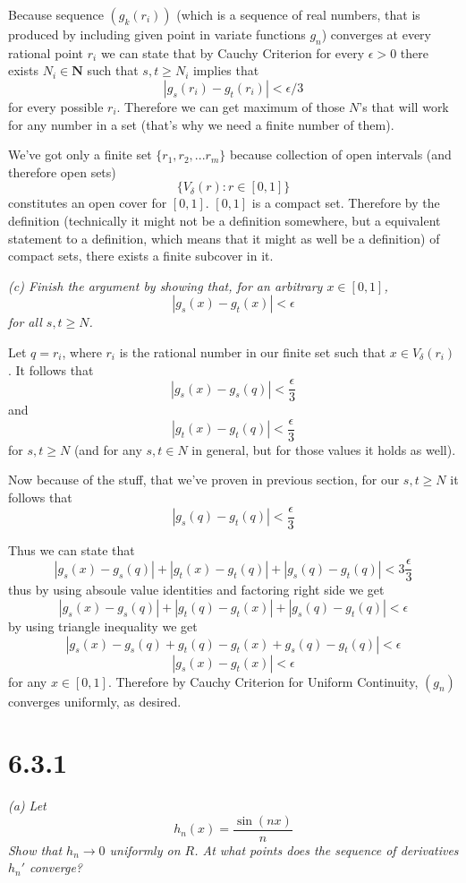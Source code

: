 \documentclass[11pt,oneside,titlepage]{book}
\begin{document}
Because sequence  $(g_k(r_i))$ (which is a sequence of real numbers, that is
produced by including given point in variate functions  $g_n$)
converges at every rational point $r_i$ we can state
that by Cauchy Criterion for every $\epsilon > 0$  there exists
$N_i \in \textbf{N}$ such that $s, t \geq N_i$ implies that
$$|g_s(r_i) - g_t(r_i)| < \epsilon/3$$
for every possible $r_i$. Therefore we can get maximum of those $N$'s
that will work for any number in a set (that's why we need a finite number
of them).

We've got only a finite set $\{r_1, r_2, ... r_m\}$ because collection of
open intervals (and therefore open sets)
$$\{V_\delta(r): r \in [0, 1]\}$$
constitutes an open cover for $[0, 1]$. $[0, 1]$ is a compact set.
Therefore by the definition (technically
it might not be a definition somewhere,
but a equivalent statement to a definition,
which means that it might as well be a definition) of compact sets,
there exists a finite subcover in it.

\textit{(c) Finish the argument by showing that, for an arbitrary
  $x \in [0, 1]$,}
$$|g_s(x) - g_t(x)| < \epsilon$$
\textit{for all $s, t \geq N$.}

Let $q = r_i$, where $r_i$ is the rational number in our finite set
such that $x \in V_\delta(r_i)$.
It follows that 
$$|g_s(x) - g_s(q)| < \frac{\epsilon}{3}$$
and 
$$|g_t(x) - g_t(q)| < \frac{\epsilon}{3}$$
for $s, t \geq N$ (and for any $s, t \in N$ in general, but for those
values it holds as well).

Now because of the stuff, that we've proven in previous section, for
our  $s, t \geq N$ it follows that 
$$|g_s(q) - g_t(q)| < \frac{\epsilon}{3}$$

Thus we can state that
$$|g_s(x) - g_s(q)| + |g_t(x) - g_t(q)| + |g_s(q) - g_t(q)|
< 3\frac{\epsilon}{3}$$
thus by  using absoule value identities and factoring right side we get
$$|g_s(x) - g_s(q)| + |g_t(q) - g_t(x)| + |g_s(q) - g_t(q)| < \epsilon$$
by using triangle inequality we get
$$|g_s(x) - g_s(q) + g_t(q) - g_t(x) + g_s(q) - g_t(q)| < \epsilon$$
$$|g_s(x) - g_t(x) | < \epsilon$$
for any $x \in [0, 1]$. Therefore by Cauchy Criterion for Uniform Continuity,
$(g_n)$ converges uniformly, as desired.

\section*{6.3.1}
\textit{(a) Let }
$$h_n(x) = \frac{\sin{(nx)}}{n}$$
\textit{Show that $h_n \to 0$ uniformly on $R$. At what points does the
  sequence of derivatives $h_n'$ converge?}
\end{document}
